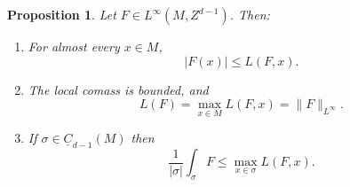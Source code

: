 \documentclass[reqno,11pt]{amsart}
\newcommand*\dif{\mathop{}\!\mathrm{d}}
\newcommand{\Chain}{\underline C}
\newtheorem{proposition}[theorem]{Proposition}
\theoremstyle{definition}
\numberwithin{equation}{section}
\begin{document}
\begin{proposition}\label{crandall}
Let $F \in L^\infty(M, Z^{d - 1})$. Then:
\begin{enumerate}
\item For almost every $x \in M$,
$$|F(x)| \leq L(F, x).$$
\label{crandall LDT}
\item The local comass is bounded, and \label{crandall linfinity}
$$L(F) = \max_{x \in M} L(F, x) = \|F\|_{L^\infty}.$$
\item If $\sigma \in \Chain_{d - 1}(M)$ then \label{crandall best curl is ABC}
$$\frac{1}{|\sigma|} \int_\sigma F \leq \max_{x \in \sigma} L(F, x).$$
\end{enumerate}
\end{proposition}
\end{document}
